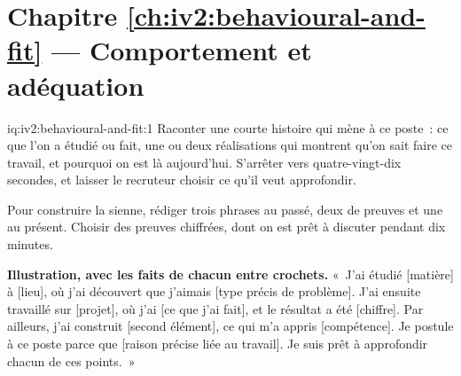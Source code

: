 \section*{Chapitre \ref{ch:iv2:behavioural-and-fit} --- Comportement et adéquation}

\begin{solution}{iq:iv2:behavioural-and-fit:1}
Raconter une courte histoire qui mène à ce poste~: ce que l'on a étudié ou fait, une ou deux réalisations qui montrent qu'on sait faire ce travail, et pourquoi on est là aujourd'hui. S'arrêter vers quatre-vingt-dix secondes, et laisser le recruteur choisir ce qu'il veut approfondir.

Pour construire la sienne, rédiger trois phrases au passé, deux de preuves et une au présent. Choisir des preuves chiffrées, dont on est prêt à discuter pendant dix minutes.

\textbf{Illustration, avec les faits de chacun entre crochets.} «~J'ai étudié [matière] à [lieu], où j'ai découvert que j'aimais [type précis de problème]. J'ai ensuite travaillé sur [projet], où j'ai [ce que j'ai fait], et le résultat a été [chiffre]. Par ailleurs, j'ai construit [second élément], ce qui m'a appris [compétence]. Je postule à ce poste parce que [raison précise liée au travail]. Je suis prêt à approfondir chacun de ces points.~»

\end{solution}

